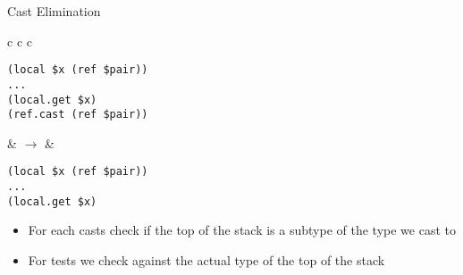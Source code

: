 \documentclass{beamer}
\begin{document}
\begin{frame}[fragile]{Cast Elimination}{}
  \begin{center}
  \begin{tabular}{c c c}
    \begin{minipage}{\widthof{\texttt{(local \$x (ref \$pair))}}}
\begin{verbatim}
(local $x (ref $pair))
...
(local.get $x)
(ref.cast (ref $pair))
\end{verbatim}
\end{minipage}
    &
    $\rightarrow$
    &
\begin{minipage}{\widthof{\texttt{(local \$x (ref \$pair))}}}
\begin{verbatim}
(local $x (ref $pair))
...
(local.get $x)

\end{verbatim}
\end{minipage}
  \end{tabular}
  \end{center}
  \vfill
\begin{itemize}
\item For each casts check if the top of the stack is a subtype of the type we
  cast to
\item For tests we check against the actual type of the top of the stack
\end{itemize}
\end{frame}
\end{document}

